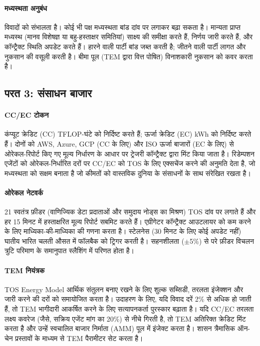 \documentclass[11pt]{article}
\begin{document}
\paragraph{मध्यस्थता अनुबंध} विवादों को संभालता है। कोई भी पक्ष मध्यस्थता बांड दांव पर लगाकर बढ़ा सकता है। मान्यता प्राप्त मध्यस्थ (मानव विशेषज्ञ या बहु-हस्ताक्षर समितियां) साक्ष्य की समीक्षा करते हैं, निर्णय जारी करते हैं, और कॉन्ट्रैक्ट स्थिति अपडेट करते हैं। हारने वाली पार्टी बांड जब्त करती है; जीतने वाली पार्टी लागत और नुकसान की वसूली करती है। बीमा पूल (TEM द्वारा वित्त पोषित) विनाशकारी नुकसान को कवर करता है।

\subsection{परत 3: संसाधन बाजार}
\paragraph{CC/EC टोकन} कंप्यूट क्रेडिट (CC) TFLOP-घंटे को निर्दिष्ट करते हैं; ऊर्जा क्रेडिट (EC) kWh को निर्दिष्ट करते हैं। दोनों को AWS, Azure, GCP (CC के लिए) और ISO ऊर्जा बाजारों (EC के लिए) से ओरेकल-रिपोर्ट किए गए मूल्य निर्धारण के आधार पर ट्रेजरी कॉन्ट्रैक्ट द्वारा मिंट किया जाता है। रिडेम्पशन एजेंटों को ओरेकल-निर्धारित दरों पर CC/EC को TOS के लिए एक्सचेंज करने की अनुमति देता है, जो मध्यस्थता को सक्षम बनाता है जो कीमतों को वास्तविक दुनिया के संसाधनों के साथ संरेखित रखता है।

\paragraph{ओरेकल नेटवर्क} 21 स्वतंत्र फ़ीडर (वाणिज्यिक डेटा प्रदाताओं और समुदाय नोड्स का मिश्रण) TOS दांव पर लगाते हैं और हर 15 मिनट में हस्ताक्षरित मूल्य रिपोर्ट सबमिट करते हैं। एग्रीगेटर कॉन्ट्रैक्ट आउटलायर को कम करने के लिए माध्यिका-की-माध्यिका की गणना करता है। स्टेलनेस (30 मिनट के लिए कोई अपडेट नहीं) घातीय भारित चलती औसत में फॉलबैक को ट्रिगर करती है। सहनशीलता ($\pm$5\%) से परे फ़ीडर विचलन त्रुटि परिमाण के समानुपात स्लैशिंग में परिणत होता है।

\paragraph{TEM नियंत्रक} TOS Energy Model आर्थिक संतुलन बनाए रखने के लिए शुल्क सब्सिडी, तरलता इंजेक्शन और जारी करने की दरों को समायोजित करता है। उदाहरण के लिए, यदि विवाद दरें 2\% से अधिक हो जाती हैं, तो TEM भागीदारी आकर्षित करने के लिए सत्यापनकर्ता पुरस्कार बढ़ाता है। यदि CC/EC तरलता लक्ष्य कवरेज (जैसे, सक्रिय एजेंट मांग का 20\%) से नीचे गिरती है, तो TEM अतिरिक्त क्रेडिट मिंट करता है और उन्हें स्वचालित बाजार निर्माता (AMM) पूल में इंजेक्ट करता है। शासन त्रैमासिक ऑन-चेन प्रस्तावों के माध्यम से TEM पैरामीटर सेट करता है।
\end{document}
